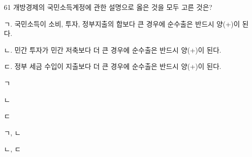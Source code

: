 \begin{question}{61}
개방경제의 국민소득계정에 관한 설명으로 옳은 것을 모두 고른 것은?
\begin{framedtext}
ㄱ. 국민소득이 소비, 투자, 정부지출의 합보다 큰 경우에 순수출은 반드시 양(+)이 된다. \par
ㄴ. 민간 투자가 민간 저축보다 더 큰 경우에 순수출은 반드시 양(+)이 된다. \par
ㄷ. 정부 세금 수입이 지출보다 더 큰 경우에 순수출은 반드시 양(+)이 된다.
\end{framedtext}
\begin{choices}
  \item ㄱ
  \item ㄴ
  \item ㄷ
  \item ㄱ, ㄴ
  \item ㄴ, ㄷ
\end{choices}
\end{question}
